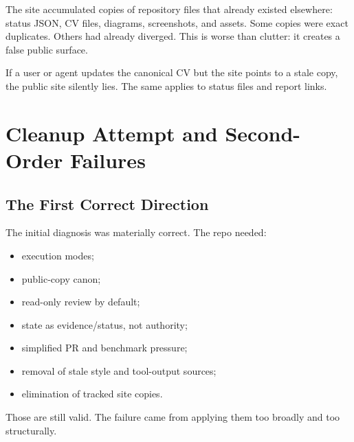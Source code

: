 \documentclass[a4paper,11pt,openany]{report}
\begin{document}
The site accumulated copies of repository files that already existed elsewhere:
status JSON, CV files, diagrams, screenshots, and assets. Some copies were exact
duplicates. Others had already diverged. This is worse than clutter: it creates a
false public surface.

If a user or agent updates the canonical CV but the site points to a stale copy,
the public site silently lies. The same applies to status files and report links.


\chapter{Cleanup Attempt and Second-Order Failures}
\label{ch:cleanup-failures}


\section{The First Correct Direction}

The initial diagnosis was materially correct. The repo needed:

\begin{itemize}
  \item execution modes;
  \item public-copy canon;
  \item read-only review by default;
  \item state as evidence/status, not authority;
  \item simplified PR and benchmark pressure;
  \item removal of stale style and tool-output sources;
  \item elimination of tracked site copies.
\end{itemize}

Those are still valid. The failure came from applying them too broadly and too
structurally.
\end{document}
